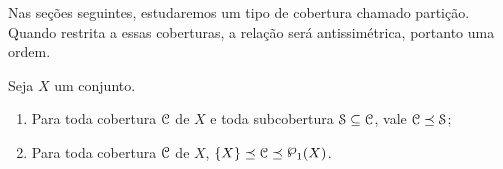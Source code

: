 Nas seções seguintes, estudaremos um tipo de cobertura chamado partição. Quando restrita a essas coberturas, a relação será antissimétrica, portanto uma ordem.

\begin{exercise}
\label{prop:refinamento.propriedades}
Seja $X$ um conjunto.
	\begin{enumerate}
	\item Para toda cobertura $\mathcal{C}$ de $X$ e toda subcobertura $\mathcal S \subseteq \mathcal{C}$, vale $\mathcal{C} \preceq \mathcal S$;
	\item Para toda cobertura $\mathcal{C}$ de $X$, $\{X\} \refin \cober \refin \p_1(X)$.
	\end{enumerate}
\end{exercise}

\begin{comment}
\begin{proposition}
\label{prop:lema.cardinalidade.subcobertura.refinamento}
Sejam $X$ um conjunto e $\cober$ e $\cober'$ coberturas de $X$ tais que $\cober \refin \cober'$. Para toda subcobertura $\mathcal{S'} \subseteq \cober'$, alguma subcobertura $\mathcal{S} \subseteq \cober$ satisfaz
	\begin{equation*}
	\card{\mathcal{S}} \leq \card{\mathcal{S'}}.
	\end{equation*}
\end{proposition}
\begin{proof}
Seja $\mathcal{S'} \subseteq \cober'$ uma subcobertura finita, $\kappa := \card{\mathcal{S'}}$ sua cardinalidade e indexemos seus elementos como $\mathcal{S'} =: \set{S'_k}{k \in \kappa}$. Primeiro notemos que, como $\cober \refin \cober'$ e $\cober' \refin \mathcal{S'}$ (pois $\mathcal{S'}$ é subcobertura), segue da transitividade de $\refin$ que $\cober \refin \mathcal{S'}$. Isso significa que, para todo $S'_i \in \mathcal{S'}$, algum $S_i \in \cober$ satisfaz $S'_i \subseteq S_i$. Definamos $\mathcal{S} := \set{S_i}{i \in \kappa}$. Como pode valer $S_i = S_j$ para $i \neq j$, segue que $\card{\mathcal{S}} \leq \card{\mathcal{S'}}$. Ainda, como $\mathcal{S'}$ é cobertura de $X$, $\mathcal{S}$ também é, pois
	\begin{equation*}
	X = \bigcup_{i \in [n]} S'_i \subseteq \bigcup_{i \in [n]} S_i.
	\qedhere
	\end{equation*}
\end{proof}
\end{comment}


